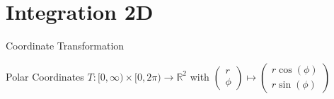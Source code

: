 
\section{Integration 2D}
\begin{frame}[t]{Coordinate Transformation}

\begin{block}{Polar Coordinates}
 \(T:[0,\infty)\times[0,2\pi)\to\mathbb{R}^2\) with
 \(\begin{pmatrix}r\\ \phi \end{pmatrix}\mapsto  \begin{pmatrix}r\cos(\phi)\\r\sin(\phi)\end{pmatrix}\)
\end{block}
\end{frame}

%
%
%
%
%

